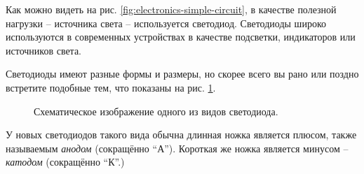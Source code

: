 \documentclass[../sparc.tex]{subfiles}
\begin{document}
Как можно видеть на рис. \ref{fig:electronics-simple-circuit}, в качестве
полезной нагрузки -- источника света -- используется светодиод.  Светодиоды широко
используются в современных устройствах в качестве подсветки, индикаторов или
источников света.

Светодиоды имеют разные формы и размеры, но скорее всего вы рано или поздно
встретите подобные тем, что показаны на рис. \ref{fig:electronics-led}.

\begin{figure}[ht]
  \centering
  \caption{Схематическое изображение одного из видов светодиода.}
  \label{fig:electronics-led}
\end{figure}

У новых светодиодов такого вида обычна длинная ножка является плюсом, также
называемым \emph{анодом} (сокращённо ``А'').  Короткая же ножка является минусом
-- \emph{катодом} (сокращённо ``К''.)
\end{document}
